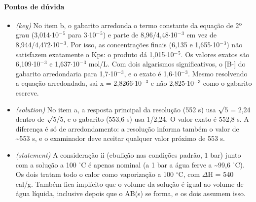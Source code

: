 \documentclass{article}%
\begin{document}
\paragraph{Pontos de dúvida}%
\begin{itemize}%
\item%
\textit{(key)} No item b, o gabarito arredonda o termo constante da equação de 2º grau (3,014$\cdot$10$^{-}$$^{5}$ para 3$\cdot$10$^{-}$$^{5}$) e parte de 8,96/4,48$\cdot$10$^{-}$$^3$ em vez de 8,944/4,472$\cdot$10$^{-}$$^3$. Por isso, as concentrações finais (6,135 e 1,655$\cdot$10$^{-}$$^3$) não satisfazem exatamente o Kps: o produto dá 1,015$\cdot$10$^{-}$$^{5}$. Os valores exatos são 6,109$\cdot$10$^{-}$$^3$ e 1,637$\cdot$10$^{-}$$^3$ mol/L. Com dois algarismos significativos, o {[}B-{]} do gabarito arredondaria para 1,7$\cdot$10$^{-}$$^3$, e o exato é 1,6$\cdot$10$^{-}$$^3$. Mesmo resolvendo a equação arredondada, sai x = 2,8266$\cdot$10$^{-}$$^3$ e não 2,825$\cdot$10$^{-}$$^3$ como o gabarito escreve.%
\item%
\textit{(solution)} No item a, a resposta principal da resolução (552 s) usa $\surd$5 = 2,24 dentro de $\surd$5/5, e o gabarito (553,6 s) usa 1/2,24. O valor exato é 552,8 s. A diferença é só de arredondamento: a resolução informa também o valor de \textasciitilde{}553 s, e o examinador deve aceitar qualquer valor próximo de 553 s.%
\item%
\textit{(statement)} A consideração ii (ebulição nas condições padrão, 1 bar) junto com a solução a 100 $^\circ$C é apenas nominal (a 1 bar a água ferve a \textasciitilde{}99,6 $^\circ$C). Os dois tratam todo o calor como vaporização a 100 $^\circ$C, com $\Delta$H = 540 cal/g. Também fica implícito que o volume da solução é igual ao volume de água líquida, inclusive depois que o AB(s) se forma, e os dois assumem isso.%
\end{itemize}%
\end{document}
